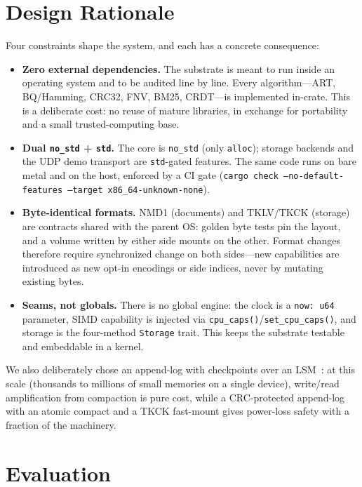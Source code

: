 \documentclass[11pt,twocolumn]{article}
\begin{document}
\section{Design Rationale}
\label{sec:rationale}

Four constraints shape the system, and each has a concrete consequence:

\begin{itemize}
  \item \textbf{Zero external dependencies.} The substrate is meant to run
        inside an operating system and to be audited line by line. Every
        algorithm---ART, BQ/Hamming, CRC32, FNV, BM25, CRDT---is implemented
        in-crate. This is a deliberate cost: no reuse of mature libraries, in
        exchange for portability and a small trusted-computing base.
  \item \textbf{Dual \texttt{no\_std} + \texttt{std}.} The core is
        \texttt{no\_std} (only \texttt{alloc}); storage backends and the UDP
        demo transport are \texttt{std}-gated features. The same code runs on
        bare metal and on the host, enforced by a CI gate
        (\texttt{cargo check --no-default-features --target
        x86\_64-unknown-none}).
  \item \textbf{Byte-identical formats.} NMD1 (documents) and TKLV/TKCK
        (storage) are contracts shared with the parent OS: golden byte tests
        pin the layout, and a volume written by either side mounts on the
        other. Format changes therefore require synchronized change on both
        sides---new capabilities are introduced as new opt-in encodings or
        side indices, never by mutating existing bytes.
  \item \textbf{Seams, not globals.} There is no global engine: the clock is a
        \texttt{now: u64} parameter, SIMD capability is injected via
        \texttt{cpu\_caps()}/\texttt{set\_cpu\_caps()}, and storage is the
        four-method \texttt{Storage} trait. This keeps the substrate testable
        and embeddable in a kernel.
\end{itemize}

We also deliberately chose an append-log with checkpoints over an
LSM~\cite{rocksdb}: at this scale (thousands to millions of small memories on a
single device), write/read amplification from compaction is pure cost, while a
CRC-protected append-log with an atomic compact and a TKCK fast-mount gives
power-loss safety with a fraction of the machinery.

\section{Evaluation}
\label{sec:eval}
\end{document}
